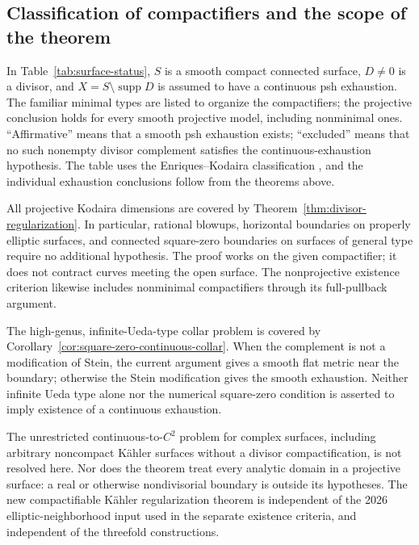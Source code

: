 \documentclass[11pt]{amsart}
\theoremstyle{definition}
\theoremstyle{remark}
\numberwithin{equation}{section}
\newcommand{\supp}{\operatorname{supp}}
\begin{document}
\subsection{Classification of compactifiers and the scope of the theorem}
\label{subsec:surface-classification}
In Table~\ref{tab:surface-status}, $S$ is a smooth compact connected
surface, $D\ne0$ is a divisor, and $X=S\setminus\supp D$ is assumed
to have a continuous psh exhaustion. The familiar minimal types are
listed to organize the compactifiers; the projective conclusion
holds for every smooth projective model, including nonminimal ones.
``Affirmative'' means that a smooth psh exhaustion exists;
``excluded'' means that no such nonempty divisor complement satisfies
the continuous-exhaustion hypothesis. The table uses the
Enriques--Kodaira classification \cite[Chapter~VI]{BHPV2004}, and the
individual exhaustion conclusions follow from the theorems above.

All projective Kodaira dimensions are covered by
Theorem~\ref{thm:divisor-regularization}. In particular, rational
blowups, horizontal boundaries on properly elliptic surfaces, and
connected square-zero boundaries on surfaces of general type require
no additional hypothesis. The proof works on the given compactifier;
it does not contract curves meeting the open surface. The
nonprojective existence criterion likewise includes nonminimal
compactifiers through its full-pullback argument.

The high-genus, infinite-Ueda-type collar problem is covered by
Corollary~\ref{cor:square-zero-continuous-collar}. When the complement
is not a modification of Stein, the current argument gives a smooth
flat metric near the boundary; otherwise the Stein modification gives
the smooth exhaustion. Neither infinite Ueda type alone nor the
numerical square-zero condition is asserted to imply existence of a
continuous exhaustion.

The unrestricted continuous-to-$C^2$ problem for complex surfaces,
including arbitrary noncompact K\"ahler surfaces without a divisor
compactification, is not resolved here. Nor does the theorem treat
every analytic domain in a projective surface: a real or otherwise
nondivisorial boundary is outside its hypotheses. The new
compactifiable K\"ahler regularization theorem is independent of the
2026 elliptic-neighborhood input used in the separate existence
criteria, and independent of the threefold constructions.
\end{document}
